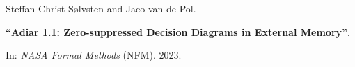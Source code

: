 Steffan Christ Sølvsten and Jaco van de Pol.

{\bf ``Adiar 1.1: Zero-suppressed Decision Diagrams in External Memory''}.

In: \emph{NASA Formal Methods} (NFM).
2023.

\medskip


\label{cite:2023.nfm}